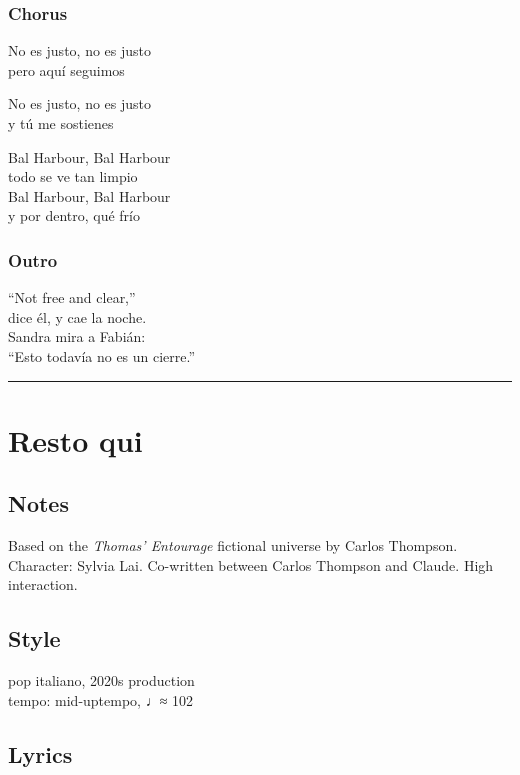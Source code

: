 \subsubsection{Chorus}\label{chorus-45}

No es justo, no es justo\\
pero aquí seguimos

No es justo, no es justo\\
y tú me sostienes

Bal Harbour, Bal Harbour\\
todo se ve tan limpio\\
Bal Harbour, Bal Harbour\\
y por dentro, qué frío

\subsubsection{Outro}\label{outro-5}

``Not free and clear,''\\
dice él, y cae la noche.\\
Sandra mira a Fabián:\\
``Esto todavía no es un cierre.''

\begin{center}\rule{0.5\linewidth}{0.5pt}\end{center}

\section{Resto qui}\label{resto-qui}

\subsection{Notes}\label{notes-19}

Based on the \emph{Thomas' Entourage} fictional universe by Carlos
Thompson. Character: Sylvia Lai. Co-written between Carlos Thompson and
Claude. High interaction.

\subsection{Style}\label{style-18}

pop italiano, 2020s production\\
tempo: mid-uptempo, ♩≈ 102

\subsection{Lyrics}\label{lyrics-18}

